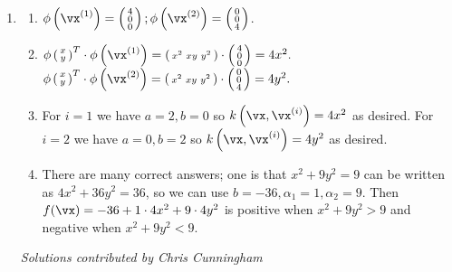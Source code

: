 \documentclass{article}
\begin{document}
\begin{enumerate}
\item \label{ML_ex_kerneltrick_solution}
\begin{enumerate}
    \item $\phi\left( \vx^{(1)}\right) = \left( \begin{smallmatrix} 4 \\ 0 \\ 0 \end{smallmatrix} \right);
           \phi\left( \vx^{(2)}\right) = \left( \begin{smallmatrix} 0 \\ 0 \\ 4 \end{smallmatrix} \right)$.
    \item $\phi\left( \begin{smallmatrix} x \\ y         \end{smallmatrix} \right)^T \cdot \phi\left(\vx^{(1)}\right) = 
               \left( \begin{smallmatrix} x^2 & xy & y^2 \end{smallmatrix} \right)   \cdot \left( \begin{smallmatrix} 4 \\ 0 \\ 0 \end{smallmatrix} \right) = 4x^2.$
    \newline
          $\phi\left( \begin{smallmatrix} x \\ y         \end{smallmatrix} \right)^T \cdot \phi\left(\vx^{(2)}\right) = 
               \left( \begin{smallmatrix} x^2 & xy & y^2 \end{smallmatrix}\right)    \cdot \left( \begin{smallmatrix} 0 \\ 0 \\ 4 \end{smallmatrix} \right) = 4y^2.$
    \item For $i=1$ we have $a=2, b=0$ so $k\left(\vx, \vx^{(i)}\right) = 4x^2$ as desired. 
    \newline
    For $i=2$ we have $a=0, b=2$ so $k\left(\vx, \vx^{(i)}\right) = 4y^2$ as desired.
    \item There are many correct answers; one is that $x^2 + 9y^2 = 9$ can be written as $4x^2 + 36y^2 = 36$, so we can use $b = -36, \alpha_1 = 1, \alpha_2 = 9$. Then $f(\vx) = -36 + 1\cdot4x^2 + 9\cdot 4y^2$ is positive when $x^2 + 9y^2 > 9$ and negative when $x^2 + 9y^2 < 9$.
\end{enumerate}

{\em Solutions contributed by Chris Cunningham}

\end{enumerate}
\end{document}
